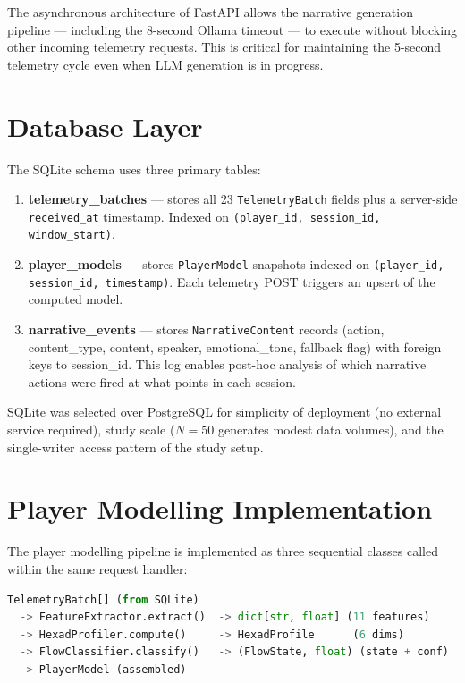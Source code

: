 \documentclass[12pt,a4paper]{report}
\begin{document}
The asynchronous architecture of FastAPI allows the narrative generation pipeline --- including the 8-second Ollama timeout --- to execute without blocking other incoming telemetry requests. This is critical for maintaining the 5-second telemetry cycle even when LLM generation is in progress.

\section{Database Layer}

The SQLite schema uses three primary tables:

\begin{enumerate}
\item \textbf{telemetry\_batches} --- stores all 23 \texttt{TelemetryBatch} fields plus a server-side \texttt{received\_at} timestamp. Indexed on \texttt{(player\_id, session\_id, window\_start)}.
\item \textbf{player\_models} --- stores \texttt{PlayerModel} snapshots indexed on \texttt{(player\_id, session\_id, timestamp)}. Each telemetry POST triggers an upsert of the computed model.
\item \textbf{narrative\_events} --- stores \texttt{NarrativeContent} records (action, content\_type, content, speaker, emotional\_tone, fallback flag) with foreign keys to session\_id. This log enables post-hoc analysis of which narrative actions were fired at what points in each session.
\end{enumerate}

SQLite was selected over PostgreSQL for simplicity of deployment (no external service required), study scale ($N = 50$ generates modest data volumes), and the single-writer access pattern of the study setup.

\section{Player Modelling Implementation}

The player modelling pipeline is implemented as three sequential classes called within the same request handler:

\begin{lstlisting}[language=Python, caption={Player modelling pipeline flow.}]
TelemetryBatch[] (from SQLite)
  -> FeatureExtractor.extract()  -> dict[str, float] (11 features)
  -> HexadProfiler.compute()     -> HexadProfile      (6 dims)
  -> FlowClassifier.classify()   -> (FlowState, float) (state + conf)
  -> PlayerModel (assembled)
\end{lstlisting}
\end{document}
